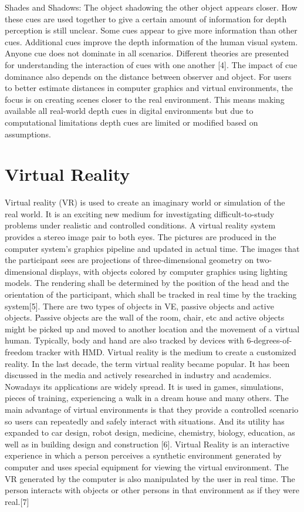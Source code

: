 Shades and Shadows: The object shadowing the other object appears closer.
How these cues are used together to give a certain amount of information for depth perception is still unclear. Some cues appear to give more information than other cues. Additional cues improve the depth information of the human visual system. Anyone cue does not dominate in all scenarios. Different theories are presented for understanding the interaction of cues with one another [4]. The impact of cue dominance also depends on the distance between observer and object. 
For users to better estimate distances in computer graphics and virtual environments, the focus is on creating scenes closer to the real environment. This means making available all real-world depth cues in digital environments but due to computational limitations depth cues are limited or modified based on assumptions.


\section{Virtual Reality}
Virtual reality (VR) is used to create an imaginary world or simulation of the real world. It is an exciting new medium for investigating difficult-to-study problems under realistic and controlled conditions. A virtual reality system provides a stereo image pair to both eyes. The pictures are produced in the computer system's graphics pipeline and updated in actual time. The images that the participant sees are projections of three-dimensional geometry on two-dimensional displays, with objects colored by computer graphics using lighting models. The rendering shall be determined by the position of the head and the orientation of the participant, which shall be tracked in real time by the tracking system[5].
There are two types of objects in VE, passive objects and active objects. Passive objects are the wall of the room, chair, etc and active objects might be picked up and moved to another location and the movement of a virtual human. Typically, body and hand are also tracked by devices with 6-degrees-of-freedom tracker with HMD.
Virtual reality is the medium to create a customized reality. In the last decade, the term virtual reality became popular. It has been discussed in the media and actively researched in industry and academics. Nowadays its applications are widely spread. It is used in games, simulations, pieces of training, experiencing a walk in a dream house and many others. The main advantage of virtual environments is that they provide a controlled scenario so users can repeatedly and safely interact with situations. And its utility has expanded to car design, robot design, medicine, chemistry, biology, education, as well as in building design and construction [6].
Virtual Reality is an interactive experience in which a person perceives a synthetic environment generated by computer and uses special equipment for viewing the virtual environment. The VR generated by the computer is also manipulated by the user in real time. The person interacts with objects or other persons in that environment as if they were real.[7]

